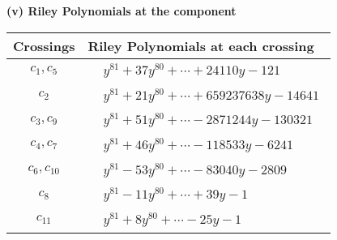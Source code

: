 \documentclass[1p]{elsarticle_modified}
\theoremstyle{definition}
\begin{document}
\flushleft \textbf{(v) Riley Polynomials at the component}\newline \\
\begin{tabular}{m{50pt}|m{274pt}}
Crossings & \hspace{64pt}Riley Polynomials at each crossing \\
\hline $$\begin{aligned}c_{1},c_{5}\end{aligned}$$&$\begin{aligned}
&y^{81}+37 y^{80}+\cdots+24110 y-121
\end{aligned}$\\
\hline $$\begin{aligned}c_{2}\end{aligned}$$&$\begin{aligned}
&y^{81}+21 y^{80}+\cdots+659237638 y-14641
\end{aligned}$\\
\hline $$\begin{aligned}c_{3},c_{9}\end{aligned}$$&$\begin{aligned}
&y^{81}+51 y^{80}+\cdots-2871244 y-130321
\end{aligned}$\\
\hline $$\begin{aligned}c_{4},c_{7}\end{aligned}$$&$\begin{aligned}
&y^{81}+46 y^{80}+\cdots-118533 y-6241
\end{aligned}$\\
\hline $$\begin{aligned}c_{6},c_{10}\end{aligned}$$&$\begin{aligned}
&y^{81}-53 y^{80}+\cdots-83040 y-2809
\end{aligned}$\\
\hline $$\begin{aligned}c_{8}\end{aligned}$$&$\begin{aligned}
&y^{81}-11 y^{80}+\cdots+39 y-1
\end{aligned}$\\
\hline $$\begin{aligned}c_{11}\end{aligned}$$&$\begin{aligned}
&y^{81}+8 y^{80}+\cdots-25 y-1
\end{aligned}$\\
\hline
\end{tabular}\\~\\
\end{document}
